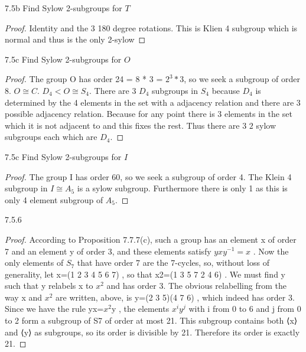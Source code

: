\documentclass{article}
\begin{document}
\begin{PROB}{7.5b}\label{Problem 7.5b.}
    Find Sylow 2-subgroups for $T$
\end{PROB}
\begin{proof}
    Identity and the 3 180 degree rotations. This is Klien 4 subgroup which is normal and thus is the only 2-sylow
\end{proof}

\begin{PROB}{7.5c}\label{Problem 7.5c.}
    Find Sylow 2-subgroups for $O$
\end{PROB}
\begin{proof}
    The group O has order 24 = 8 * 3 = $2^3 * 3$, so we seek a subgroup of order 8. $O \cong C$. $D_4 < O \cong S_4$. There are 3 $D_4$ subgroups in $S_4$ because $D_4$ is determined by the 4 elements in the set with a adjacency relation and there are 3 possible adjacency relation. Because for any point there is 3 elements in the set which it is not adjacent to and this fixes the rest. Thus there are 3 $2$ sylow subgroups each which are $D_4$.
\end{proof}

\bigskip


\begin{PROB}{7.5c}\label{Problem 7.5c.}
    Find Sylow 2-subgroups for $I$
\end{PROB}
\begin{proof}
    The group I has order 60, so we seek a subgroup of order 4. The Klein 4 subgroup in $I \cong A_5$ is a sylow subgroup. Furthermore there is only 1 as this is only 4 element subgroup of $A_5$.
\end{proof}

\bigskip

\begin{PROB}{7.5.6}\label{Problem 7.5.6.}
    
\end{PROB}
\begin{proof}
    According to Proposition 7.7.7(c), such a group has an element x of order 7 and an element y of order 3, and these elements satisfy $yxy^{-1}=x$ . Now the only elements of $S_7$ that have order 7 are the 7-cycles, so, without loss of generality, let x=(1 2 3 4 5 6 7) , so that x2=(1 3 5 7 2 4 6) . We must find y such that y relabels x to $x^2$ and has order 3. The obvious relabelling from the way x and $x^2$ are written, above, is y=(2 3 5)(4 7 6) , which indeed has order 3. Since we have the rule yx=$x^2$y , the elements $x^iy^j$ with i from 0 to 6 and j from 0 to 2 form a subgroup of S7 of order at most 21. This subgroup contains both ⟨x⟩ and ⟨y⟩ as subgroups, so its order is divisible by 21. Therefore its order is exactly 21.
\end{proof}
\end{document}
